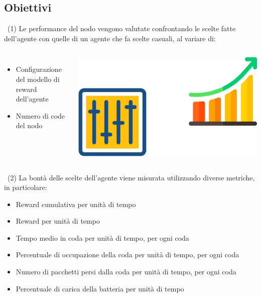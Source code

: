 \documentclass[compress]{beamer}
\begin{document}
\subsection{Obiettivi}
\begin{frame}{\subsecname\ (1)}
    Le performance del nodo vengono valutate confrontando le scelte fatte dell'agente con quelle di un agente che fa scelte casuali, al variare di:
    \begin{columns}
            \begin{minipage}{1\textwidth}
                \begin{itemize}
                    \item Configurazione del modello di reward dell'agente
                    \item Numero di code del nodo
                \end{itemize}
            \end{minipage}
            \begin{minipage}{1\textwidth}
                \begin{adjustbox}{margin=0cm 0cm 0cm 0.7cm, center} %
                    \includegraphics[width=.8\textwidth]{figs/tuning_performance.png}
                \end{adjustbox}
            \end{minipage}
    \end{columns}
\end{frame}
\begin{frame}{\subsecname\ (2)}
    La bontà delle scelte dell'agente viene misurata utilizzando diverse metriche, in particolare:
    \vspace{0.3cm}
    \begin{itemize}
        \item Reward cumulativa per unità di tempo
        \item Reward per unità di tempo
        \item Tempo medio in coda per unità di tempo, per ogni coda
        \item Percentuale di occupazione della coda per unità di tempo, per ogni coda
        \item Numero di pacchetti persi dalla coda per unità di tempo, per ogni coda
        \item Percentuale di carica della batteria per unità di tempo
    \end{itemize}
\end{frame}
\end{document}
